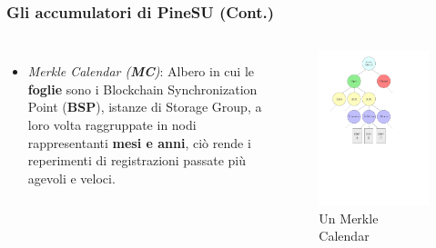 \documentclass{beamer}
\begin{document}
\begin{frame}
	\frametitle{Gli accumulatori di PineSU (Cont.)}
	\begin{columns}
		\begin{itemize}
		\item \emph{Merkle Calendar (\textbf{MC})}: Albero in cui le \textbf{foglie} sono
		i Blockchain Synchronization Point (\textbf{BSP}), istanze di
		Storage Group, a loro volta raggruppate in nodi rappresentanti
		\textbf{mesi e anni}, ciò rende i reperimenti di registrazioni passate
		più agevoli e veloci.
		\end{itemize}
		\centering
		\begin{figure}
			\includegraphics[width=\textwidth]{figures/mc1.pdf}
			\caption{Un Merkle Calendar}
		\end{figure} 
	\end{columns}
\end{frame}
\end{document}
